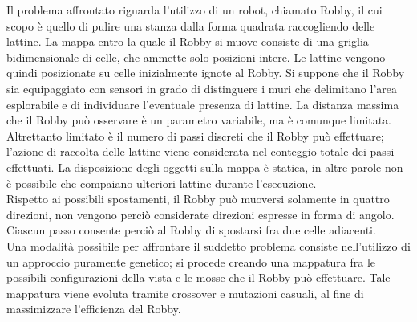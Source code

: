 Il problema affrontato riguarda l'utilizzo di un robot, chiamato Robby, il cui 
scopo è quello di pulire una stanza dalla forma quadrata raccogliendo delle lattine.
La mappa entro la quale il Robby si muove consiste di una griglia 
bidimensionale di celle, che ammette solo posizioni intere.
Le lattine vengono quindi posizionate su celle inizialmente ignote al Robby. Si 
suppone che il Robby sia equipaggiato con sensori in grado di distinguere i muri 
che delimitano l'area esplorabile e di individuare l'eventuale presenza di lattine. La distanza 
massima che il Robby può osservare è un parametro variabile, ma è comunque 
limitata. Altrettanto limitato è il numero di passi discreti che il Robby può 
effettuare; l'azione di raccolta delle lattine viene considerata nel conteggio 
totale dei passi effettuati. La disposizione degli oggetti sulla mappa è 
statica, in altre parole non è possibile che compaiano
ulteriori lattine durante l'esecuzione.
\\
Rispetto ai possibili spostamenti, il Robby può muoversi solamente
in quattro direzioni, non vengono perciò considerate direzioni espresse in 
forma di angolo. Ciascun passo consente perciò al Robby di spostarsi fra due celle 
adiacenti.
\\
Una modalità possibile per affrontare il suddetto problema consiste 
nell'utilizzo di un approccio puramente genetico; si procede creando una 
mappatura fra le possibili configurazioni della vista e le mosse che il Robby 
può effettuare. Tale mappatura viene evoluta tramite crossover e mutazioni 
casuali, al fine di massimizzare l'efficienza del Robby.
